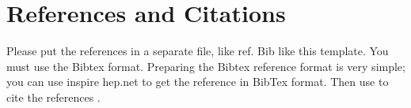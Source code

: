 \documentclass[twocolumn]{sintr}
\begin{document}
\lipsum[1]

\lipsum[2-14]

\section*{References and Citations}
Please put the references in a separate file, like ref. Bib like this template. You must use the Bibtex format. Preparing the Bibtex reference format is very simple; you can use inspire hep.net  to get the reference in BibTex format. Then use \cite{aa} to cite the references  \cite{bb}. 



\atColsEnd{\vfill}
\end{document}
